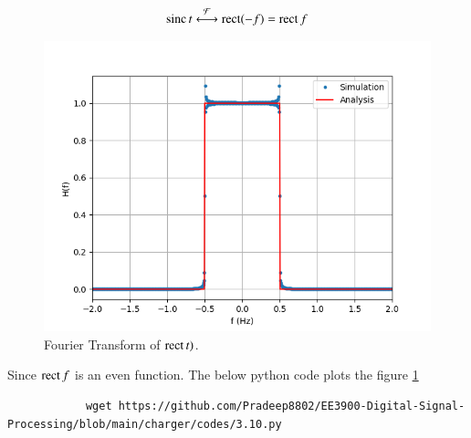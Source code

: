 \documentclass[journal,12pt,twocolumn]{IEEEtran}
\renewcommand\thesection{\arabic{section}}
\begin{document}
\begin{enumerate}[label=\thesection.\arabic*
		,ref=\thesection.\theenumi]
		\begin{align}
			\mathop{\mathrm{sinc}}{t}\overset{\mathcal{F}}{ \longleftrightarrow}\mathop{\mathrm{rect}}(-f)=\mathop{\mathrm{rect}}{f}
			\label{eq:fourier-sinc}
		\end{align}
		\begin{figure}[!ht]
			\includegraphics[width=\columnwidth]{figs/3_10.png}
			\caption{Fourier Transform of $\mathop{\mathrm{rect}}{t})$.}
			\label{fig:3.10}
		\end{figure}
		Since $\mathop{\mathrm{rect}}{f}$ is an even function.
		The below python code plots the figure \ref{fig:3.10}
		\begin{lstlisting}
			wget https://github.com/Pradeep8802/EE3900-Digital-Signal-Processing/blob/main/charger/codes/3.10.py
		\end{lstlisting} 
	\end{enumerate}
\end{document}
